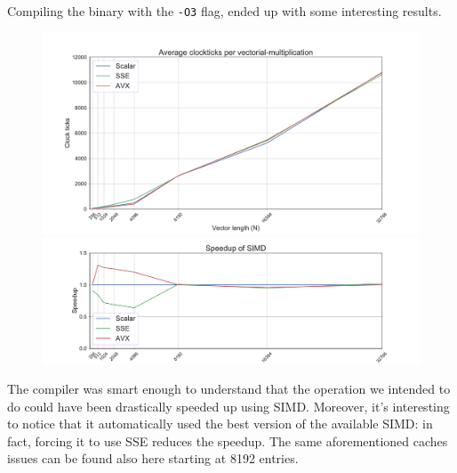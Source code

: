 \documentclass[paper=a4, fontsize=12pt]{scrartcl} %
\numberwithin{equation}{section}
\numberwithin{figure}{section}
\numberwithin{table}{section}
\begin{document}
Compiling the binary with the \texttt{-O3} flag, ended up with some interesting results.
\\
\begin{figure}[!ht]
    \includegraphics[width=\textwidth]{avg_O3.pdf}
    \includegraphics[width=\textwidth]{speedup_O3.pdf}
\end{figure}

The compiler was smart enough to understand that the operation we intended to do
could have been drastically speeded up using SIMD. Moreover, it's interesting to notice
that it automatically used the best version of the available SIMD: in fact, forcing
it to use SSE reduces the speedup. The same aforementioned caches issues can be found
also here starting at 8192 entries.
\end{document}
